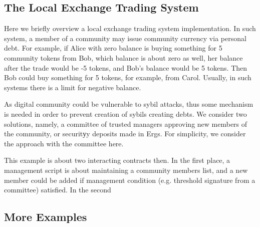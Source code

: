 \subsection{The Local Exchange Trading System}
 \label{sec:platform}

 Here we briefly overview a local exchange trading system implementation. In such system, a member of a community may
 issue community currency via personal debt. For example, if Alice with zero balance is buying something for 5
 community tokens from Bob, which balance is about zero as well, her balance after the trade would be -5 tokens, and
 Bob's balance would be 5 tokens. Then Bob could buy something for 5 tokens, for example, from Carol. Usually, in such
 systems there is a limit for negative balance.

 As digital community could be vulnerable to sybil attacks, thus some mechanism is needed in order to prevent creation
 of sybils creating debts. We consider two solutions, namely, a committee of trusted managers approving new members of
 the community, or securitуy deposits made in Ergs. For simplicity, we consider the approach with the committee here.

 This example is about two interacting contracts then. In the first place, a management script is about maintaining a
 community members list, and a new member could be added if management condition (e.g. threshold signature from a
 committee) satisfied. In the second

\subsection{More Examples}


